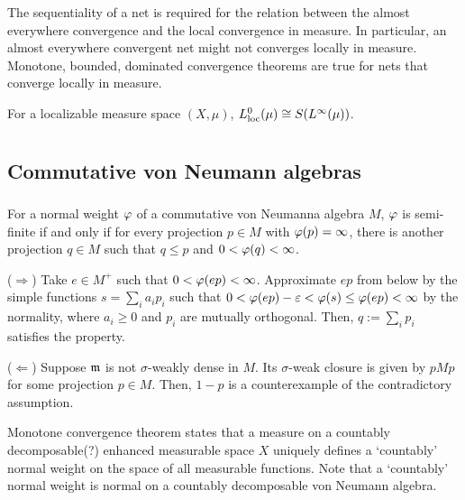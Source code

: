 \documentclass{../../large}
\begin{document}
The sequentiality of a net is required for the relation between the almost everywhere convergence and the local convergence in measure.
In particular, an almost everywhere convergent net might not converges locally in measure.
Monotone, bounded, dominated convergence theorems are true for nets that converge locally in measure.

For a localizable measure space $(X,\mu)$, $L_{\mathrm{loc}}^0(\mu)\cong S(L^\infty(\mu))$.







\chapter{}


\section{Commutative von Neumann algebras}
\subsection{}

\begin{prb}
For a normal weight $\varphi$ of a commutative von Neumanna algebra $M$, $\varphi$ is semi-finite if and only if for every projection $p\in M$ with $\varphi(p)=\infty$, there is another projection $q\in M$ such that $q\le p$ and $0<\varphi(q)<\infty$.
\end{prb}
\begin{pf}
($\Rightarrow$)
Take $e\in M^+$ such that $0<\varphi(ep)<\infty$.
Approximate $ep$ from below by the simple functions $s=\sum_ia_ip_i$ such that $0<\varphi(ep)-\varepsilon<\varphi(s)\le\varphi(ep)<\infty$ by the normality, where $a_i\ge0$ and $p_i$ are mutually orthogonal.
Then, $q:=\sum_ip_i$ satisfies the property.

($\Leftarrow$)
Suppose $\mathfrak{m}$ is not $\sigma$-weakly dense in $M$.
Its $\sigma$-weak closure is given by $pMp$ for some projection $p\in M$.
Then, $1-p$ is a counterexample of the contradictory assumption.
\end{pf}



Monotone convergence theorem states that a measure on a countably decomposable(?) enhanced measurable space $X$ uniquely defines a `countably' normal weight on the space of all measurable functions.
Note that a `countably' normal weight is normal on a countably decomposable von Neumann algebra.
\end{document}
